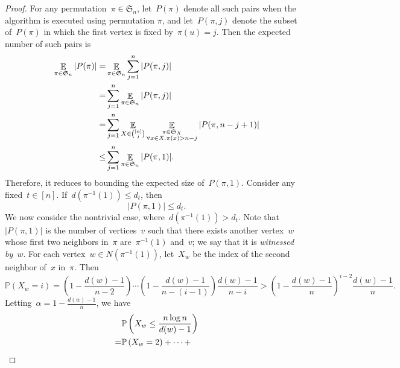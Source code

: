 \documentclass[a4paper,cleveref, autoref, 11pt, fleqn, thm-restate]{article}
\theoremstyle{plain}
\begin{document}
\begin{proof}
  For any permutation~$\pi \in {\mathfrak {S}}_{n}$,
  let~$P(\pi)$ denote all such pairs when the algorithm is executed using permutation $\pi$, and let~$P(\pi, j)$ denote the subset of~$P(\pi)$ in which the first vertex is fixed by~$\pi(u) = j$.
  Then the expected number of such pairs is
  \begin{align}
    \notag
    \mathop{\mathbb{E}}_{\pi \in {\mathfrak {S}}_{n}} |P(\pi)| = & \mathop{\mathbb{E}}_{\pi \in {\mathfrak {S}}_{n}} \sum_{j = 1}^{n} |P(\pi, j)|
    \\      \notag
    =                                                            & \sum_{j = 1}^{n} \mathop{\mathbb{E}}_{\pi \in {\mathfrak {S}}_{n}}  |P(\pi, j)|
    \\      \notag
    =                                                            & \sum_{j=1}^n
    \mathop{\mathbb{E}}_{X\in {[n]\choose j}}
    \mathop{\mathbb{E}}_{\substack{{\pi \in {\mathfrak {S}}_{X}}                                                                                           \\  \forall x\in X. \pi(x) > n - j}}
    |P(\pi, n - j + 1)|
    \\
    \le                                                          & \sum_{j=1}^n \mathop{\mathbb{E}}_{\pi \in {\mathfrak {S}}_{n}} |P(\pi, 1)|.\label{eq:4}
  \end{align}
  Therefore, it reduces to bounding the expected size of~$P(\pi, 1)$.
  Consider any fixed~$t\in [n]$.
  If~$d(\pi^{-1}(1)) \le d_{t}$, then
  \begin{equation}
    \label{eq:5}
    |P(\pi, 1)| \le d_{t}.
  \end{equation}
  We now consider the nontrivial case, where~$d(\pi^{-1}(1)) > d_{t}$.
  Note that~$|P(\pi, 1)|$ is the number of vertices~$v$ such that there exists another vertex~$w$ whose first two neighbors in~$\pi$ are~$\pi^{-1}(1)$ and~$v$; we say that it is \emph{witnessed by~$w$}.
  For each vertex~$w\in N(\pi^{-1}(1))$, let~$X_{w}$ be the index of the second neighbor of~$x$ in~$\pi$.  Then
  \[
    \mathbb{P}\left( X_{w}=i\right) = \left(1-\frac {d(w)-1}{n-2}\right)\cdots \left(1-\frac {d(w)-1}{n-(i-1)}\right) \frac{d(w)-1}{n-i} >                                                   \left(1- \frac {d(w)-1}{n} \right)^{i - 2} \frac{d(w)-1}{n}.
  \]
  Letting~$\alpha = 1-\frac {d(w)-1}{n}$, we have
  \begin{align}
    \notag
      & \mathbb{P}\left(X_{w}\le {\frac {n \log n}{d(w)-1}} \right)
    \\
    \notag
    = & \mathbb{P}\left(X_{w}=2  \right) + \cdots +

\end{align}
\end{proof}
\end{document}
